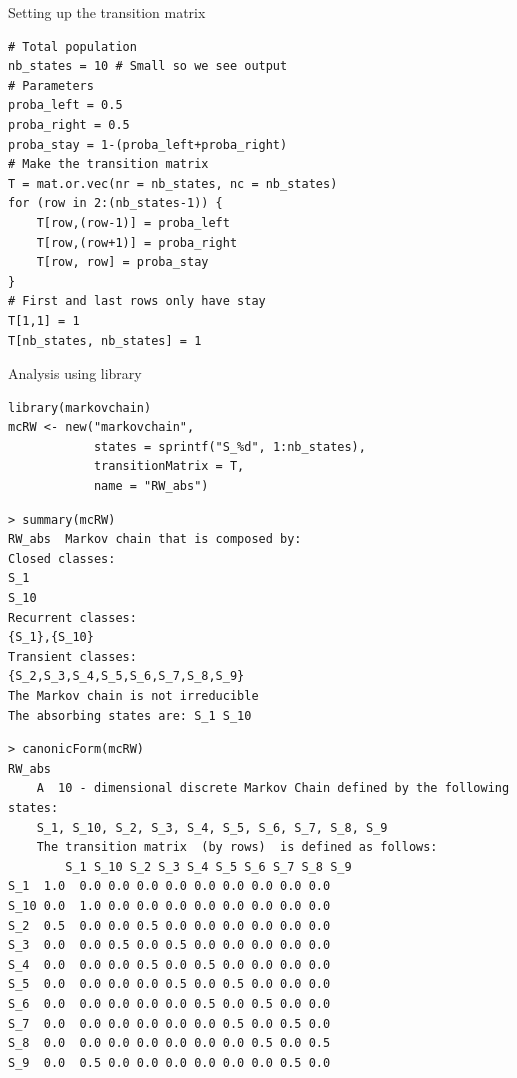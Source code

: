 \documentclass[aspectratio=169]{beamer}
\begin{document}
\begin{frame}[fragile]{Setting up the transition matrix}
\begin{lstlisting}[language=Renhanced]
# Total population
nb_states = 10 # Small so we see output
# Parameters
proba_left = 0.5
proba_right = 0.5
proba_stay = 1-(proba_left+proba_right)
# Make the transition matrix
T = mat.or.vec(nr = nb_states, nc = nb_states)
for (row in 2:(nb_states-1)) {
    T[row,(row-1)] = proba_left
    T[row,(row+1)] = proba_right
    T[row, row] = proba_stay
}
# First and last rows only have stay
T[1,1] = 1
T[nb_states, nb_states] = 1    
\end{lstlisting}
\end{frame}

\begin{frame}[fragile]{Analysis using  library}
\begin{lstlisting}
library(markovchain)
mcRW <- new("markovchain", 
            states = sprintf("S_%d", 1:nb_states),
            transitionMatrix = T,
            name = "RW_abs")
\end{lstlisting}
\vfill
\begin{lstlisting}[language=Renhanced]
> summary(mcRW)
RW_abs  Markov chain that is composed by: 
Closed classes: 
S_1 
S_10 
Recurrent classes: 
{S_1},{S_10}
Transient classes: 
{S_2,S_3,S_4,S_5,S_6,S_7,S_8,S_9}
The Markov chain is not irreducible 
The absorbing states are: S_1 S_10
\end{lstlisting}
\end{frame}

\begin{frame}[fragile]
\begin{lstlisting}
> canonicForm(mcRW)
RW_abs 
    A  10 - dimensional discrete Markov Chain defined by the following states: 
    S_1, S_10, S_2, S_3, S_4, S_5, S_6, S_7, S_8, S_9 
    The transition matrix  (by rows)  is defined as follows: 
        S_1 S_10 S_2 S_3 S_4 S_5 S_6 S_7 S_8 S_9
S_1  1.0  0.0 0.0 0.0 0.0 0.0 0.0 0.0 0.0 0.0
S_10 0.0  1.0 0.0 0.0 0.0 0.0 0.0 0.0 0.0 0.0
S_2  0.5  0.0 0.0 0.5 0.0 0.0 0.0 0.0 0.0 0.0
S_3  0.0  0.0 0.5 0.0 0.5 0.0 0.0 0.0 0.0 0.0
S_4  0.0  0.0 0.0 0.5 0.0 0.5 0.0 0.0 0.0 0.0
S_5  0.0  0.0 0.0 0.0 0.5 0.0 0.5 0.0 0.0 0.0
S_6  0.0  0.0 0.0 0.0 0.0 0.5 0.0 0.5 0.0 0.0
S_7  0.0  0.0 0.0 0.0 0.0 0.0 0.5 0.0 0.5 0.0
S_8  0.0  0.0 0.0 0.0 0.0 0.0 0.0 0.5 0.0 0.5
S_9  0.0  0.5 0.0 0.0 0.0 0.0 0.0 0.0 0.5 0.0
\end{lstlisting}
\end{frame}
\end{document}
